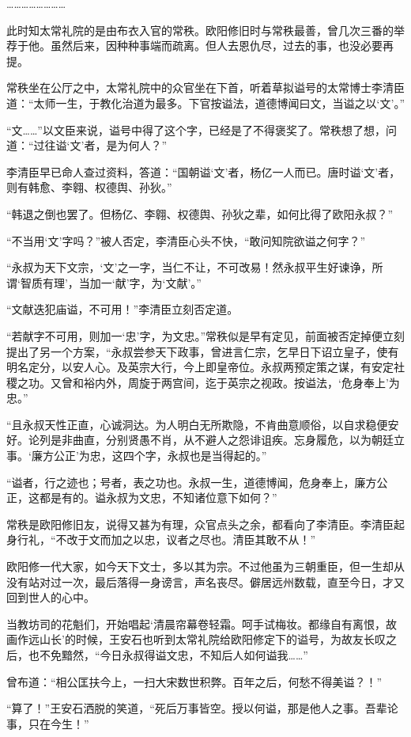 ……………………

此时知太常礼院的是由布衣入官的常秩。欧阳修旧时与常秩最善，曾几次三番的举荐于他。虽然后来，因种种事端而疏离。但人去恩仇尽，过去的事，也没必要再提。

常秩坐在公厅之中，太常礼院中的众官坐在下首，听着草拟谥号的太常博士李清臣道：“太师一生，于教化治道为最多。下官按谥法，道德博闻曰文，当谥之以‘文’。”

“文……”以文臣来说，谥号中得了这个字，已经是了不得褒奖了。常秩想了想，问道：“过往谥‘文’者，是为何人？”

李清臣早已命人查过资料，答道：“国朝谥‘文’者，杨亿一人而已。唐时谥‘文’者，则有韩愈、李翱、权德舆、孙狄。”

“韩退之倒也罢了。但杨亿、李翱、权德舆、孙狄之辈，如何比得了欧阳永叔？”

“不当用‘文’字吗？”被人否定，李清臣心头不快，“敢问知院欲谥之何字？”

“永叔为天下文宗，‘文’之一字，当仁不让，不可改易！然永叔平生好谏诤，所谓‘智质有理’，当加一‘献’字，为‘文献’。”

“文献迭犯庙谥，不可用！”李清臣立刻否定道。

“若献字不可用，则加一‘忠’字，为文忠。”常秩似是早有定见，前面被否定掉便立刻提出了另一个方案，“永叔尝参天下政事，曾进言仁宗，乞早日下诏立皇子，使有明名定分，以安人心。及英宗大行，今上即皇帝位。永叔两预定策之谋，有安定社稷之功。又曾和裕内外，周旋于两宫间，迄于英宗之视政。按谥法，‘危身奉上’为忠。”

“且永叔天性正直，心诚洞达。为人明白无所欺隐，不肯曲意顺俗，以自求稳便安好。论列是非曲直，分别贤愚不肖，从不避人之怨诽诅疾。忘身履危，以为朝廷立事。‘廉方公正’为忠，这四个字，永叔也是当得起的。”

“谥者，行之迹也；号者，表之功也。永叔一生，道德博闻，危身奉上，廉方公正，这都是有的。谥永叔为文忠，不知诸位意下如何？”

常秩是欧阳修旧友，说得又甚为有理，众官点头之余，都看向了李清臣。李清臣起身行礼，“不改于文而加之以忠，议者之尽也。清臣其敢不从！”

欧阳修一代大家，如今天下文士，多以其为宗。不过他虽为三朝重臣，但一生却从没有站对过一次，最后落得一身谤言，声名丧尽。僻居远州数载，直至今日，才又回到世人的心中。

当教坊司的花魁们，开始唱起‘清晨帘幕卷轻霜。呵手试梅妆。都缘自有离恨，故画作远山长’的时候，王安石也听到太常礼院给欧阳修定下的谥号，为故友长叹之后，也不免黯然，“今日永叔得谥文忠，不知后人如何谥我……”

曾布道：“相公匡扶今上，一扫大宋数世积弊。百年之后，何愁不得美谥？！”

“算了！”王安石洒脱的笑道，“死后万事皆空。授以何谥，那是他人之事。吾辈论事，只在今生！”

